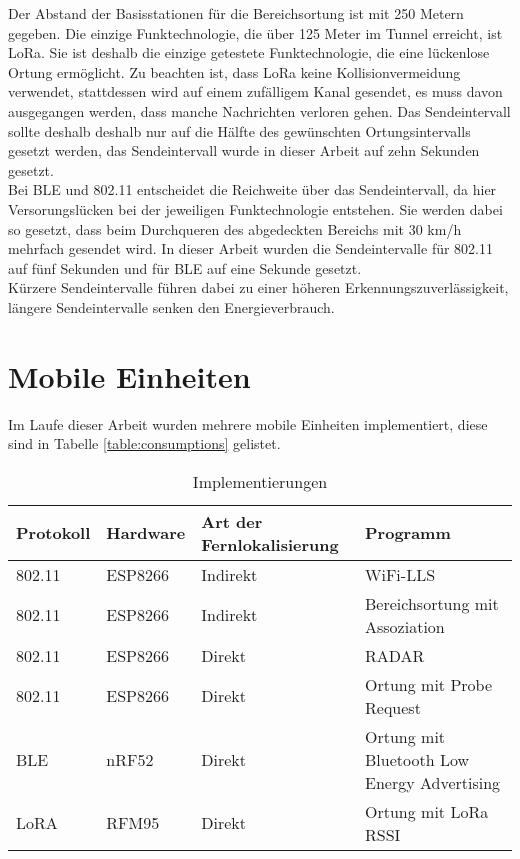 Der Abstand der Basisstationen für die Bereichsortung ist mit 250 Metern gegeben. 
Die einzige Funktechnologie, die über 125 Meter im Tunnel erreicht, ist LoRa.
Sie ist deshalb die einzige getestete Funktechnologie, die eine lückenlose Ortung ermöglicht.
Zu beachten ist, dass LoRa keine Kollisionvermeidung verwendet, stattdessen wird auf einem zufälligem Kanal gesendet, es muss davon ausgegangen werden, dass manche Nachrichten verloren gehen.
Das Sendeintervall sollte deshalb deshalb nur auf die Hälfte des gewünschten Ortungsintervalls gesetzt werden, das Sendeintervall wurde in dieser Arbeit auf zehn Sekunden gesetzt.\\
Bei BLE und 802.11 entscheidet die Reichweite über das Sendeintervall, da hier Versorungslücken bei der jeweiligen Funktechnologie entstehen.
Sie werden dabei so gesetzt, dass beim Durchqueren des abgedeckten Bereichs mit 30 km/h mehrfach gesendet wird.
In dieser Arbeit wurden die Sendeintervalle für 802.11 auf fünf Sekunden und für BLE auf eine Sekunde gesetzt.\\
Kürzere Sendeintervalle führen dabei zu einer höheren Erkennungszuverlässigkeit, längere Sendeintervalle senken den Energieverbrauch.

\section{Mobile Einheiten}
Im Laufe dieser Arbeit wurden mehrere mobile Einheiten implementiert, diese sind in Tabelle \ref{table:consumptions} gelistet.

\begin{table}[h]
	\centering
	\caption{Implementierungen}
	\label{table:ranges}
	\begin{tabular}{p{2cm}|p{2.5cm}|p{2.5cm}|p{5.8cm}}
		Protokoll & Hardware & Art der Fernlokalisierung & Programm \\
		\hline
		802.11 & ESP8266 & Indirekt & WiFi-LLS \cite{chen2007design} \\
		802.11 & ESP8266 & Indirekt & Bereichsortung mit Assoziation \\
		\hline
		802.11 & ESP8266 & Direkt & RADAR \cite{bahl2000radar} \\
		802.11 & ESP8266 & Direkt & Ortung mit Probe Request \\
		\hline
		BLE & nRF52 & Direkt & Ortung mit Bluetooth Low Energy Advertising \cite{jianyong2014rssi} \\
		\hline
		LoRA & RFM95 & Direkt & Ortung mit LoRa RSSI \cite{kim2016poster} \\
	\end{tabular}
\end{table}


